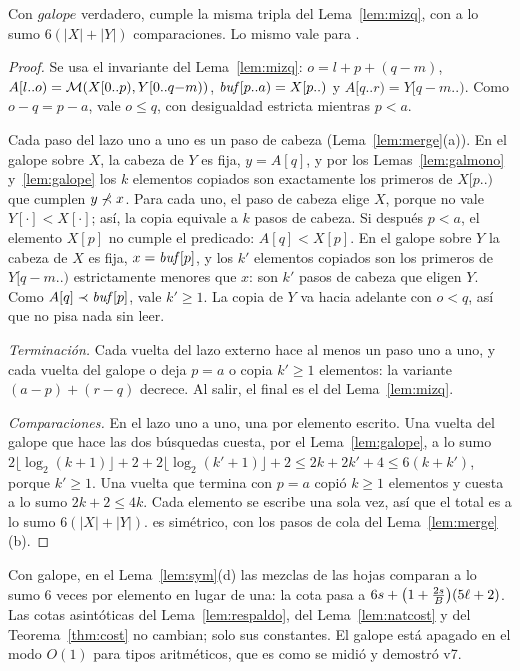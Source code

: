 \begin{lema}\label{lem:mizqg}
Con $\mathit{galope}$ verdadero, \MIzq cumple la misma tripla del
Lema~\ref{lem:mizq}, con a lo sumo $6(|X|+|Y|)$ comparaciones. Lo mismo vale para
\MDer.
\end{lema}
\begin{proof}
Se usa el invariante del Lema~\ref{lem:mizq}: $o=l+p+(q-m)$,
$A[l..o)=\mathcal{M}(X[0..p),Y[0..q{-}m))$, $\mathit{buf}[p..a)=X[p..)$ y $A[q..r)=Y[q{-}m..)$. Como
$o-q=p-a$, vale $o\le q$, con desigualdad estricta mientras $p<a$.

Cada paso del lazo uno a uno es un paso de cabeza (Lema~\ref{lem:merge}(a)). En el
galope sobre $X$, la cabeza de $Y$ es fija, $y=A[q]$, y por los
Lemas~\ref{lem:galmono} y~\ref{lem:galope} los $k$ elementos copiados son exactamente
los primeros de $X[p..)$ que cumplen $y\not\prec x$. Para cada uno, el paso de cabeza elige
$X$, porque no vale $Y[\cdot]\lt X[\cdot]$; así, la copia equivale a $k$ pasos de
cabeza. Si después $p<a$, el elemento $X[p]$ no cumple el predicado: $A[q]\lt X[p]$. En
el galope sobre $Y$ la cabeza de $X$ es fija, $x=\mathit{buf}[p]$, y los $k'$ elementos
copiados son los primeros de $Y[q{-}m..)$ estrictamente menores que $x$: son $k'$ pasos
de cabeza que eligen $Y$. Como $A[q]\prec\mathit{buf}[p]$, vale $k'\ge 1$. La copia de $Y$ va
hacia adelante con $o<q$, así que no pisa nada sin leer.

\emph{Terminación.} Cada vuelta del lazo externo hace al menos un paso uno a uno, y
cada vuelta del galope o deja $p=a$ o copia $k'\ge1$ elementos: la variante
$(a-p)+(r-q)$ decrece. Al salir, el final es el del Lema~\ref{lem:mizq}.

\emph{Comparaciones.} En el lazo uno a uno, una por elemento escrito. Una vuelta del
galope que hace las dos búsquedas cuesta, por el Lema~\ref{lem:galope}, a lo sumo
$2\lfloor\log_2(k{+}1)\rfloor+2+2\lfloor\log_2(k'{+}1)\rfloor+2\le 2k+2k'+4\le 6(k+k')$,
porque $k'\ge1$. Una vuelta que termina con $p=a$ copió $k\ge1$ elementos y cuesta a lo
sumo $2k+2\le 4k$. Cada elemento se escribe una sola vez, así que el total es a lo sumo
$6(|X|+|Y|)$. \MDer es simétrico, con los pasos de cola del Lema~\ref{lem:merge}(b).
\end{proof}

\begin{observacion}
Con galope, en el Lema~\ref{lem:sym}(d) las mezclas de las hojas comparan a lo sumo 6
veces por elemento en lugar de una: la cota pasa a
$6s+\bigl(1+\frac{2s}{B}\bigr)(5\ell+2)$. Las cotas asintóticas del
Lema~\ref{lem:respaldo}, del Lema~\ref{lem:natcost} y del Teorema~\ref{thm:cost} no
cambian; solo sus constantes. El galope está apagado en el modo $O(1)$ para tipos
aritméticos, que es como se midió y demostró v7.
\end{observacion}

